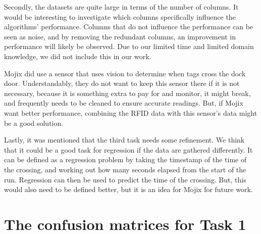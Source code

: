 \documentclass{article}
\begin{document}
Secondly, the datasets are quite large in terms of the number of columns.
It would be interesting to investigate which columns specifically influence the algorithms' performance.
Columns that do not influence the performance can be seen as noise, and by removing the redundant columns, an improvement in performance will likely be observed.
Due to our limited time and limited domain knowledge, we did not include this in our work.

Mojix did use a sensor that uses vision to determine when tags cross the dock door.
Understandably, they do not want to keep this sensor there if it is not necessary, because it is something extra to pay for and monitor, it might break, and frequently needs to be cleaned to ensure accurate readings.
But, if Mojix want better performance, combining the \ac{RFID} data with this sensor's data might be a good solution.

Lastly, it was mentioned that the third task needs some refinement.
We think that it could be a good task for regression if the data are gathered differently.
It can be defined as a regression problem by taking the timestamp of the time of the crossing, and working out how many seconds elapsed from the start of the run.
Regression can then be used to predict the time of the crossing.
But, this would also need to be defined better, but it is an idea for Mojix for future work.

\clearpage




\clearpage

\appendix
\section{The confusion matrices for Task 1}
\label{appendix:CM1}
\end{document}
